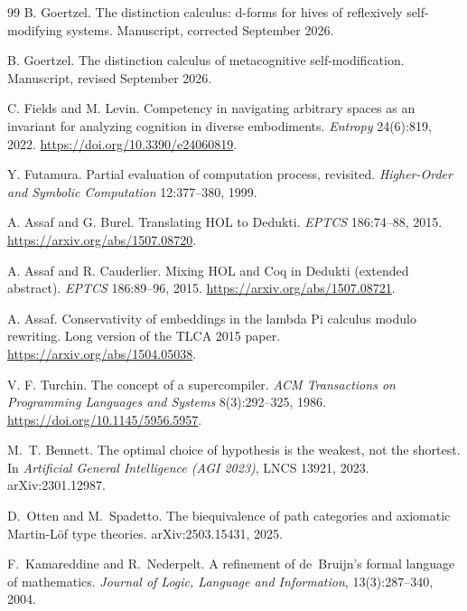 \documentclass[11pt]{article}
\theoremstyle{definition}
\theoremstyle{remark}
\begin{document}
\begin{thebibliography}{99}
B. Goertzel.
\newblock The distinction calculus: d-forms for hives of reflexively
  self-modifying systems.
\newblock Manuscript, corrected September 2026.

B. Goertzel.
\newblock The distinction calculus of metacognitive self-modification.
\newblock Manuscript, revised September 2026.

C. Fields and M. Levin.
\newblock Competency in navigating arbitrary spaces as an invariant for
  analyzing cognition in diverse embodiments.
\newblock \emph{Entropy} 24(6):819, 2022.
\newblock \url{https://doi.org/10.3390/e24060819}.

Y. Futamura.
\newblock Partial evaluation of computation process, revisited.
\newblock \emph{Higher-Order and Symbolic Computation} 12:377--380, 1999.

A. Assaf and G. Burel.
\newblock Translating HOL to Dedukti.
\newblock \emph{EPTCS} 186:74--88, 2015.
\newblock \url{https://arxiv.org/abs/1507.08720}.

A. Assaf and R. Cauderlier.
\newblock Mixing HOL and Coq in Dedukti (extended abstract).
\newblock \emph{EPTCS} 186:89--96, 2015.
\newblock \url{https://arxiv.org/abs/1507.08721}.

A. Assaf.
\newblock Conservativity of embeddings in the lambda Pi calculus modulo rewriting.
\newblock Long version of the TLCA 2015 paper.
\newblock \url{https://arxiv.org/abs/1504.05038}.

V. F. Turchin.
\newblock The concept of a supercompiler.
\newblock \emph{ACM Transactions on Programming Languages and Systems}
  8(3):292--325, 1986.
\newblock \url{https://doi.org/10.1145/5956.5957}.

M.~T. Bennett.
\newblock The optimal choice of hypothesis is the weakest, not the shortest.
\newblock In \emph{Artificial General Intelligence (AGI 2023)}, LNCS 13921, 2023.
\newblock arXiv:2301.12987.

D.~Otten and M.~Spadetto.
\newblock The biequivalence of path categories and axiomatic Martin-L\"of type
  theories.
\newblock arXiv:2503.15431, 2025.

F.~Kamareddine and R.~Nederpelt.
\newblock A refinement of de~Bruijn's formal language of mathematics.
\newblock \emph{Journal of Logic, Language and Information}, 13(3):287--340,
  2004.


\end{thebibliography}
\end{document}
